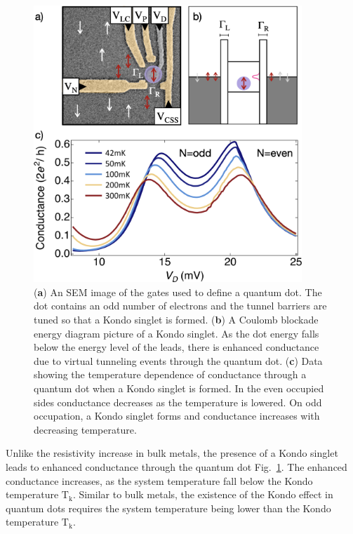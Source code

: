  \begin{figure}[!hbt]
 \begin{center}
  \includegraphics[width=0.9\textwidth]{figures/ch2/crop_FiguresMaster.011.png}
  \caption[Kondo effect in a quantum dot in the Kondo regime]{\label{fig:ch2/kondo_regime_conductance} 
  (\textbf{a}) An SEM image of the gates used to define a quantum dot. The dot contains an odd number of electrons and the tunnel barriers are tuned so that a Kondo singlet is formed. (\textbf{b}) A Coulomb blockade energy diagram picture of a Kondo singlet. As the dot energy falls below the energy level of the leads, there is enhanced conductance due to virtual tunneling events through the quantum dot. (\textbf{c}) Data showing the temperature dependence of conductance through a quantum dot when a Kondo singlet is formed. In the even occupied sides conductance decreases as the temperature is lowered. On odd occupation, a Kondo singlet forms and conductance increases with decreasing temperature.}
 \end{center}
\end{figure}



 Unlike the resistivity increase in bulk metals, the presence of a Kondo singlet leads to enhanced conductance through the quantum dot Fig.~\ref{fig:ch2/kondo_regime_conductance}. The enhanced conductance increases, as the system temperature fall below the Kondo temperature $\mathrm{T_k}$. Similar to bulk metals, the existence of the Kondo effect in quantum dots requires the system temperature being lower than the Kondo temperature $\mathrm{T_k}$. 


